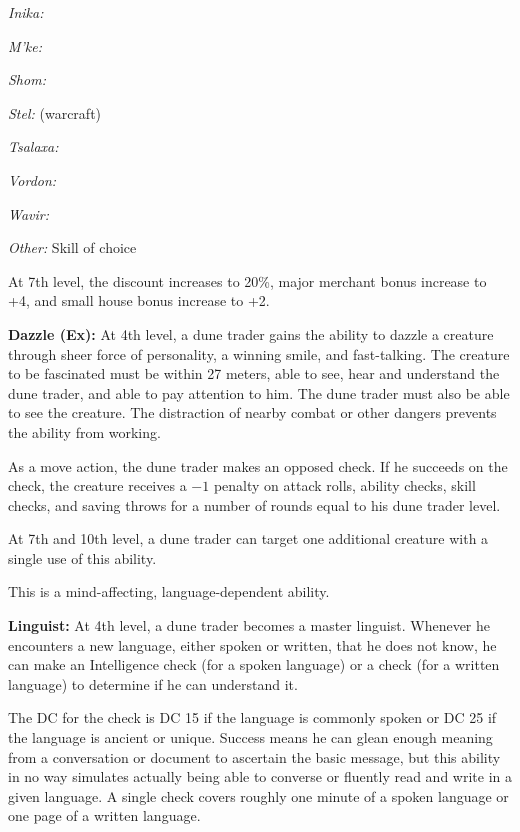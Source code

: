 {\textit{Inika:} 

\textit{M'ke:} 

\textit{Shom:} 

\textit{Stel:}  (warcraft)

\textit{Tsalaxa:} 

\textit{Vordon:} 

\textit{Wavir:} 

\textit{Other:} Skill of choice

At 7th level, the discount increases to 20\%, major merchant bonus increase to +4, and small house bonus increase to +2.

\textbf{Dazzle (Ex):} At 4th level, a dune trader gains the ability to dazzle a creature through sheer force of personality, a winning smile, and fast-talking. The creature to be fascinated must be within 27 meters, able to see, hear and understand the dune trader, and able to pay attention to him. The dune trader must also be able to see the creature. The distraction of nearby combat or other dangers prevents the ability from working.

As a move action, the dune trader makes an opposed  check. If he succeeds on the check, the creature receives a $-1$ penalty on attack rolls, ability checks, skill checks, and saving throws for a number of rounds equal to his dune trader level.

At 7th and 10th level, a dune trader can target one additional creature with a single use of this ability.

This is a mind-affecting, language-dependent ability.

\textbf{Linguist:} At 4th level, a dune trader becomes a master linguist. Whenever he encounters a new language, either spoken or written, that he does not know, he can make an Intelligence check (for a spoken language) or a  check (for a written language) to determine if he can understand it.

The DC for the check is DC 15 if the language is commonly spoken or DC 25 if the language is ancient or unique. Success means he can glean enough meaning from a conversation or document to ascertain the basic message, but this ability in no way simulates actually being able to converse or fluently read and write in a given language. A single check covers roughly one minute of a spoken language or one page of a written language.

}

